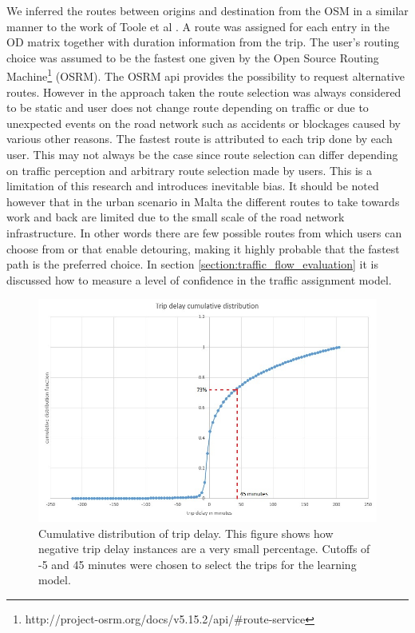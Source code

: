 \documentclass[12pt, a4paper]{report}
\theoremstyle{definition}
\theoremstyle{definition}%
\theoremstyle{definition}%
\theoremstyle{definition}%
\theoremstyle{definition}%
\theoremstyle{definition}%
\begin{document}
We inferred the routes between origins and destination from the OSM in a similar manner to the work of Toole et al \cite{Toole2015}. A route was assigned for each entry in the OD matrix together with duration information from the trip. The user's routing choice was assumed to be the fastest one given by the Open Source Routing Machine\footnote{http://project-osrm.org/docs/v5.15.2/api/\#route-service} (OSRM). The OSRM api provides the possibility to request alternative routes. However in the approach taken the route selection was always considered to be static and user does not change route depending on traffic or due to  unexpected events on the road network such as accidents or blockages caused by various other reasons. The fastest route is attributed to each trip done by each user. This may not always be the case since route selection can differ depending on traffic perception and arbitrary route selection made by users. This is a limitation of this research and introduces inevitable bias. It should be noted however that in the urban scenario in Malta the different routes to take towards work and back are limited due to the small scale of the road network infrastructure. In other words there are few possible routes from which users can choose from or that enable detouring, making it highly probable that the fastest path is the preferred choice. In section \ref{section:traffic_flow_evaluation} it is discussed how to measure a level of confidence in the traffic assignment model.


\begin{figure}[hp]	
	\includegraphics[scale=0.60]{Trip_delay_cumm_distribution.jpg}
	\centering
	\caption[Trip delay cumulative distribution]{Cumulative distribution of trip delay. This figure shows how negative trip delay instances are a very small percentage. Cutoffs  of -5 and 45 minutes were chosen to select the trips for the learning model.  }
	\label{fig:trip_delay_cum_distribution}
\end{figure}
\end{document}
